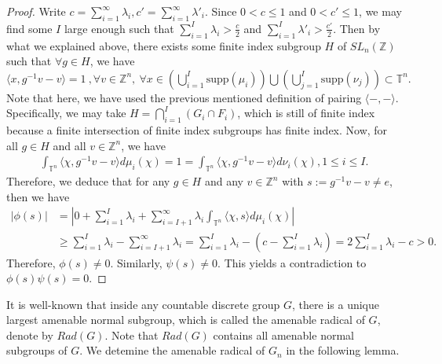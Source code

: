 \documentclass[12pt]{amsart}
\theoremstyle{definition}
\theoremstyle{remark}
\begin{document}
\begin{proof}
Write $c=\sum\limits_{i=1}^{\infty}\lambda_{i}, c'=\sum\limits_{i=1}^{\infty}\lambda'_{i}$. Since $0 <c \le 1$ and $0<c' \le 1$, we may find some $I$ large enough such that $\sum\limits_{i=1}^{I}\lambda_{i}>\frac{c}{2}$ and $\sum\limits_{i=1}^{I}\lambda'_{i}>\frac{c'}{2}$. Then by what we explained above, there exists some finite index subgroup $H$ of $SL_{n}(\mathbb{Z})$ such that $\forall g \in H$, we have $\langle x,g^{-1}v-v \rangle = 1\ ,\forall v\in \mathbb{Z}^{n},\ \forall x\in (\bigcup\limits_{i=1}^{I}\text{supp}(\mu _{i}))\bigcup(\bigcup\limits_{j=1}^{I}\text{supp}(\nu _{j}))\subset \mathbb{T}^n.$ Note that here, we have used the previous mentioned definition of pairing $\langle -,-\rangle.$
Specifically, we may take $H = \bigcap\limits_{i=1}^{I}(G_{i}\cap F_{i})$, which is still of finite index because a finite intersection of finite index subgroups has finite index. Now, for all $g\in H$ and all $v\in \mathbb{Z}^n$, we have \begin{align*}
    \int_{\mathbb{T}^n}\langle \chi,g^{-1}v-v \rangle d\mu_{i}(\chi)=1=\int_{\mathbb{T}^{n}}\langle \chi,g^{-1}v-v\rangle d\nu_{i}(\chi),1\le i\le I.
\end{align*}
Therefore, we deduce that for any $g\in H$ and any $v\in \mathbb{Z}^n$ with $s:=g^{-1}v-v\ne e$, then we have 
\begin{align*}
    |\phi(s)|&=|0+\sum\limits_{i=1}^{I}\lambda_{i}+\sum\limits_{i=I+1}^{\infty}\lambda_{i}\int_{\mathbb{T}^{n}}\langle\chi,s\rangle d\mu_{i}(\chi)|\\
    &\ge \sum\limits_{i=1}^{I}\lambda_{i}-\sum\limits_{i=I+1}^{\infty}\lambda_{i}=\sum\limits_{i=1}^{I}\lambda_{i}-(c-\sum\limits_{i=1}^{I}\lambda_{i})
    =2\sum\limits_{i=1}^{I}\lambda_{i}-c>0.
\end{align*}
Therefore, $\phi(s) \ne 0$. Similarly, $\psi(s) \ne 0$. This yields a contradiction to $\phi(s)\psi(s) = 0$.
\end{proof}




It is well-known that inside any countable discrete group $G$, there is a unique largest amenable normal subgroup, which is called the amenable radical of $G$, denote by $Rad(G)$. Note that $Rad(G)$ contains all amenable normal subgroups of $G$. We detemine the amenable radical of $G_n$ in the following lemma. 
\end{document}

